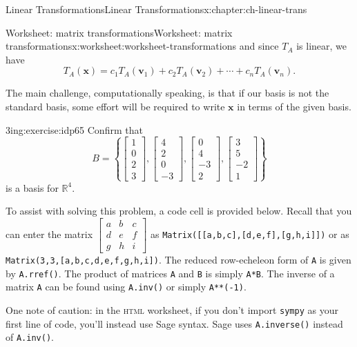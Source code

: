 \documentclass[oneside,10pt,]{book}
\newcommand{\mono}[1]{\texttt{#1}}
\newcommand{\initialism}[1]{\textsc{\MakeLowercase{#1}}}
\numberwithin{equation}{section}
\newcommand{\R}{\mathbb{R}}
\newcommand{\vv}{\mathbf{v}}
\newcommand{\xx}{\mathbf{x}}
\newcommand{\amp}{&}
\begin{document}
\begin{chapterptx}{Linear Transformations}{}{Linear Transformations}{}{}{x:chapter:ch-linear-trans}
\begin{worksheet-section}{Worksheet: matrix transformations}{}{Worksheet: matrix transformations}{}{}{x:worksheet:worksheet-transformations}
and since \(T_A\) is linear, we have%
\begin{equation*}
T_A(\xx)=c_1T_A(\vv_1)+c_2T_A(\vv_2)+\cdots +c_nT_A(\vv_n)\text{.}
\end{equation*}
%
\par
The main challenge, computationally speaking, is that if our basis is not the standard basis, some effort will be required to write \(\xx\) in terms of the given basis.%
\begin{divisionexercise}{1}{}{3in}{g:exercise:idp65}%
Confirm that%
\begin{equation*}
B=\left\{\begin{bmatrix}1\\0\\2\\3\end{bmatrix},\begin{bmatrix}4\\2\\0\\-3\end{bmatrix},
\begin{bmatrix}0\\4\\-3\\2\end{bmatrix}, \begin{bmatrix}3\\5\\-2\\1\end{bmatrix}\right\}
\end{equation*}
is a basis for \(\R^4\).%
\end{divisionexercise}%
To assist with solving this problem, a code cell is provided below. Recall that you can enter the matrix \(\begin{bmatrix}a\amp b\amp c\\d\amp e\amp f\\g\amp h\amp i\end{bmatrix}\) as \mono{Matrix([[a,b,c],[d,e,f],[g,h,i]])} or as \mono{Matrix(3,3,[a,b,c,d,e,f,g,h,i])}.%
\clearpage
The reduced row-echeleon form of \mono{A} is given by \mono{A.rref()}. The product of matrices \mono{A} and \mono{B} is simply \mono{A*B}. The inverse of a matrix \mono{A} can be found using \mono{A.inv()} or simply \mono{A**(-1)}.%
\par
One note of caution: in the \initialism{HTML} worksheet, if you don't import \mono{sympy} as your first line of code, you'll instead use Sage syntax. Sage uses \mono{A.inverse()} instead of \mono{A.inv()}.%

\end{worksheet-section}
\end{chapterptx}
\end{document}
